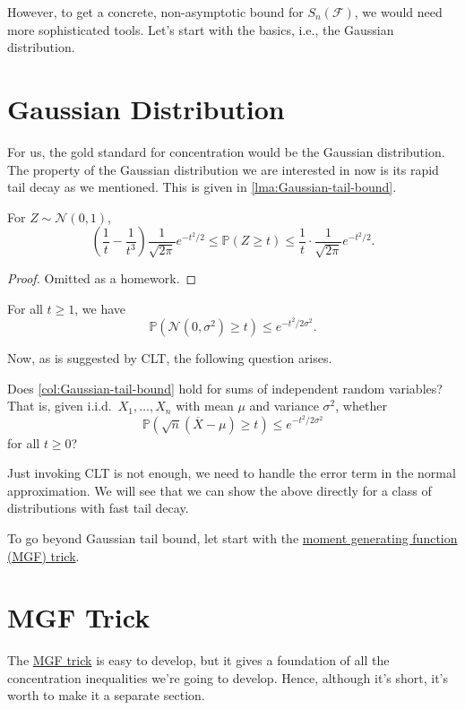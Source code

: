 However, to get a concrete, non-asymptotic bound for \(S_n(\mathscr{F} )\), we would need more sophisticated tools. Let's start with the basics, i.e., the Gaussian distribution.

\section{Gaussian Distribution}
For us, the gold standard for concentration would be the Gaussian distribution. The property of the Gaussian distribution we are interested in now is its rapid tail decay as we mentioned. This is given in \autoref{lma:Gaussian-tail-bound}.

\begin{lemma}\label{lma:Gaussian-tail-bound}
  For \(Z \sim \mathcal{N} (0, 1)\),
  \[
    \left( \frac{1}{t} - \frac{1}{t^3} \right) \frac{1}{\sqrt{2\pi } } e^{- t^2 / 2} \leq \mathbb{P}(Z \geq t) \leq \frac{1}{t} \cdot \frac{1}{\sqrt{2\pi } } e^{- t^2 / 2}.
  \]
\end{lemma}
\begin{proof}
  Omitted as a homework.
\end{proof}
\begin{corollary}\label{col:Gaussian-tail-bound}
  For all \(t \geq 1\), we have
  \[
    \mathbb{P} (\mathcal{N} (0, \sigma ^{2} ) \geq t) \leq e^{-t^2 / 2\sigma ^{2} }.
  \]
\end{corollary}

Now, as is suggested by CLT, the following question arises.

\begin{problem*}
  Does \autoref{col:Gaussian-tail-bound} hold for sums of independent random variables? That is, given i.i.d.\ \(X_1, \dots , X_n\) with mean \(\mu \) and variance \(\sigma ^{2} \), whether
  \[
    \mathbb{P} (\sqrt{n}(\overline{X} - \mu ) \geq t )\leq e^{-t^2 / 2 \sigma ^{2} }
  \]
  for all \(t \geq 0\)?
\end{problem*}
\begin{answer}
  Just invoking CLT is not enough, we need to handle the error term in the normal approximation. We will see that we can show the above directly for a class of distributions with fast tail decay.
\end{answer}

To go beyond Gaussian tail bound, let start with the \hyperref[lma:MGF-trick]{moment generating function (MGF) trick}.

\section{MGF Trick}
The \hyperref[lma:MGF-trick]{MGF trick} is easy to develop, but it gives a foundation of all the concentration inequalities we're going to develop. Hence, although it's short, it's worth to make it a separate section.

